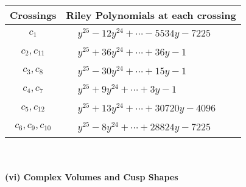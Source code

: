 \documentclass[1p]{elsarticle_modified}
\theoremstyle{definition}
\begin{document}
\begin{tabular}{m{50pt}|m{274pt}}
Crossings & \hspace{64pt}Riley Polynomials at each crossing \\
\hline $$\begin{aligned}c_{1}\end{aligned}$$&$\begin{aligned}
&y^{25}-12 y^{24}+\cdots-5534 y-7225
\end{aligned}$\\
\hline $$\begin{aligned}c_{2},c_{11}\end{aligned}$$&$\begin{aligned}
&y^{25}+36 y^{24}+\cdots+36 y-1
\end{aligned}$\\
\hline $$\begin{aligned}c_{3},c_{8}\end{aligned}$$&$\begin{aligned}
&y^{25}-30 y^{24}+\cdots+15 y-1
\end{aligned}$\\
\hline $$\begin{aligned}c_{4},c_{7}\end{aligned}$$&$\begin{aligned}
&y^{25}+9 y^{24}+\cdots+3 y-1
\end{aligned}$\\
\hline $$\begin{aligned}c_{5},c_{12}\end{aligned}$$&$\begin{aligned}
&y^{25}+13 y^{24}+\cdots+30720 y-4096
\end{aligned}$\\
\hline $$\begin{aligned}c_{6},c_{9},c_{10}\end{aligned}$$&$\begin{aligned}
&y^{25}-8 y^{24}+\cdots+28824 y-7225
\end{aligned}$\\
\hline
\end{tabular}\\~\\
\newpage\flushleft \textbf{(vi) Complex Volumes and Cusp Shapes}
\end{document}
